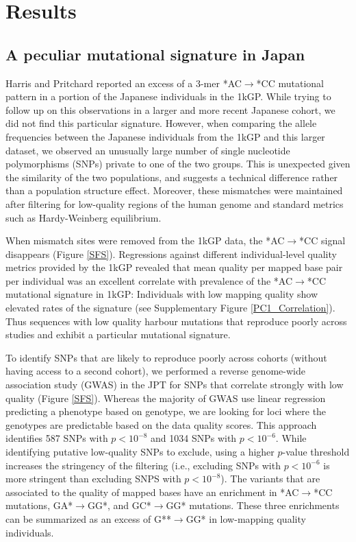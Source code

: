 \documentclass[9pt,lineno]{elife}
\begin{document}
			\section{Results}
	\subsection{A peculiar mutational signature in Japan}			
	
Harris and Pritchard reported an excess of a 3-mer *AC${\rightarrow}$*CC mutational pattern in a portion of the Japanese individuals in the 1kGP.\cite{Harris2015a}
While trying to follow up on this observations in a larger and more recent Japanese cohort, we did not find this particular signature.
However, when comparing the allele frequencies between the Japanese individuals from the 1kGP and this larger dataset, we observed an unusually large number of single nucleotide polymorphisms (SNPs) private to one of the two groups.
This is unexpected given the similarity of the two populations, and suggests a technical difference rather than a population structure effect. 
Moreover, these mismatches were maintained after filtering for low-quality regions of the human genome and standard metrics such as Hardy-Weinberg equilibrium.

When mismatch sites were removed from the 1kGP data, the  *AC${\rightarrow}$*CC signal disappears (Figure \ref{SFS}).
Regressions against different individual-level quality metrics provided by the 1kGP revealed that mean quality per mapped base pair per individual was an excellent correlate with prevalence of the  *AC${\rightarrow}$*CC mutational signature in 1kGP:
Individuals with low mapping quality show elevated rates of the signature (see Supplementary Figure \ref{PC1_Correlation}).
Thus sequences with low quality harbour mutations that reproduce poorly across studies and exhibit a particular mutational signature. 

To identify SNPs that are likely to reproduce poorly across cohorts (without having access to a second cohort), we performed a reverse genome-wide association study (GWAS) in the JPT for SNPs that correlate strongly with low quality (Figure \ref{SFS}).
Whereas the majority of GWAS use linear regression predicting a phenotype based on genotype, we are looking for loci where the genotypes are predictable based on the data quality scores.
This approach identifies 587 SNPs with $p < 10^{-8}$ and 1034 SNPs with $ p < 10^{-6}$.
While identifying putative low-quality SNPs to exclude, using a higher $p$-value threshold increases the stringency of the filtering (i.e., excluding SNPs with $ p < 10^{-6}$ is more stringent than excluding SNPS with $p < 10^{-8}$). 
The variants that are associated to the quality of mapped bases have an enrichment in *AC${\rightarrow}$*CC mutations, GA*${\rightarrow}$GG*, and GC*${\rightarrow}$GG* mutations.
These three enrichments can be summarized as an excess of G**${\rightarrow}$GG* in low-mapping quality individuals.
\end{document}
